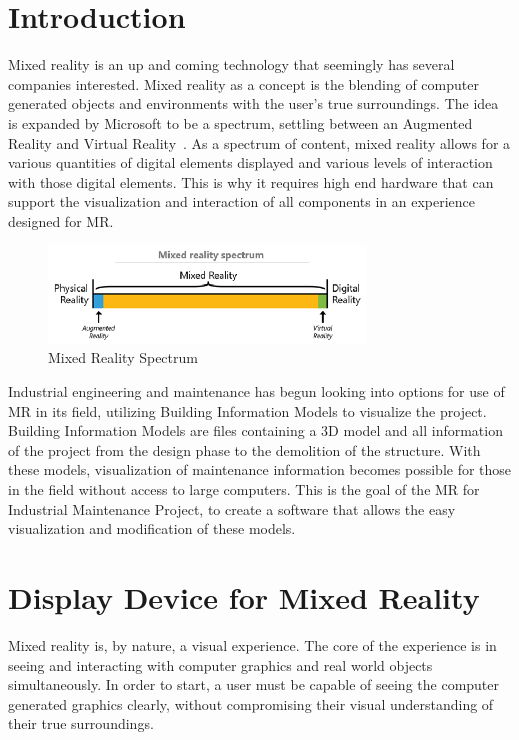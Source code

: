 \documentclass[10pt,draftclsnofoot,onecolumn,letterpaper]{IEEEtran}
\begin{document}
\section{Introduction}
Mixed reality is an up and coming technology that seemingly has several companies interested. Mixed reality as a concept is the blending of computer generated objects and environments with the user's true surroundings. The idea is expanded by Microsoft to be a spectrum, settling between an Augmented Reality and Virtual Reality~\cite{MRWhat}.
As a spectrum of content, mixed reality allows for a various quantities of digital elements displayed and various levels of interaction with those digital elements. This is why it requires high end hardware that can support the visualization and interaction of all components in an experience designed for MR.\par
\begin{figure}[ht]
    \centering
    \includegraphics[width=0.75\textwidth]{mixed-reality-spectrum.eps}
    \caption{Mixed Reality Spectrum~\cite{MRWhat}}
    \label{fig:my_label}
\end{figure}
Industrial engineering and maintenance has begun looking into options for use of MR in its field, utilizing Building Information Models to visualize the project. Building Information Models are files containing a 3D model and all information of the project from the design phase to the demolition of the structure. With these models, visualization of maintenance information becomes possible for those in the field without access to large computers. This is the goal of the MR for Industrial Maintenance Project, to create a software that allows the easy visualization and modification of these models.\par

\section{Display Device for Mixed Reality}
Mixed reality is, by nature, a visual experience. The core of the experience is in seeing and interacting with computer graphics and real world objects simultaneously. In order to start, a user must be capable of seeing the computer generated graphics clearly, without compromising their visual understanding of their true surroundings.\par
\end{document}
